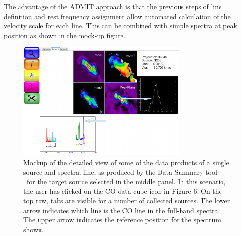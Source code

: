 The advantage of the ADMIT approach is that the previous steps of line definition
and rest frequency assignment allow automated calculation of the velocity scale
for each line. This can be combined with simple spectra at peak position as
shown in the mock-up figure.

\begin{figure}[t]
\centering
\includegraphics[width=0.75\textwidth]{moments.png}
\hspace{0.03in}
\caption{\small \setlength{\baselineskip}{0.85\baselineskip}
Mockup of the detailed view of some of the data products of a 
single source and spectral line, as produced by the Data Summary tool \
for the target source selected in the middle panel. In this scenario, 
the user has clicked on the CO data cube icon in Figure 6. 
On the top row, tabs are visible for a number of collected sources. 
The lower arrow indicates which line is the CO line in the full-band 
spectra. The upper arrow indicates the reference position for the spectrum shown.
  }
 \label{fig:moments}
\end{figure}
